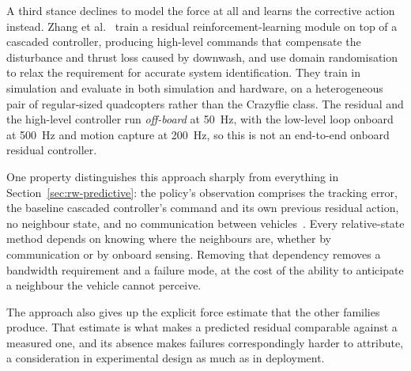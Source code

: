 
A third stance declines to model the force at all and learns the corrective action instead. Zhang
et al.~\cite{zhang2024proxfly} train a residual reinforcement-learning module on top of a cascaded
controller, producing high-level commands that compensate the disturbance and thrust loss caused by
downwash, and use domain randomisation to relax the requirement for accurate system identification.
They train in simulation and evaluate in both simulation and hardware, on a heterogeneous pair of
regular-sized quadcopters rather than the Crazyflie class. The residual and the high-level
controller run \emph{off-board} at \SI{50}{\hertz}, with the low-level loop onboard at
\SI{500}{\hertz} and motion capture at \SI{200}{\hertz}, so this is not an end-to-end onboard
residual controller.

One property distinguishes this approach sharply from everything in
Section~\ref{sec:rw-predictive}: the policy's observation comprises the tracking error, the
baseline cascaded controller's command and its own previous residual action, no neighbour state,
and no communication between vehicles~\cite{zhang2024proxfly}. Every relative-state method depends on knowing where the
neighbours are, whether by communication or by onboard sensing. Removing that dependency removes a
bandwidth requirement and a failure mode, at the cost of the ability to anticipate a neighbour the
vehicle cannot perceive.

The approach also gives up the explicit force estimate that the other families produce. That
estimate is what makes a predicted residual comparable against a measured one, and its absence
makes failures correspondingly harder to attribute, a consideration in experimental design as
much as in deployment.



